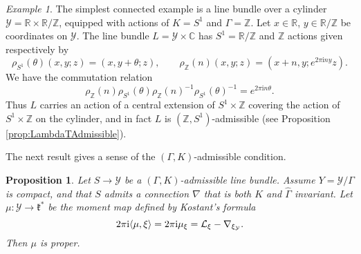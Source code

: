 \documentclass[11pt,reqno]{amsart}
\newtheorem{proposition}[theorem]{Proposition}
\theoremstyle{definition}
\theoremstyle{remark}
\newtheorem{example}[theorem]{Example}
\newcommand{\pair}[2]{\langle #1, #2 \rangle}
\renewcommand{\i}{{\mathrm{i}}}
\def\k{\ensuremath{\mathfrak{k}}}
\def\L{\ensuremath{\mathcal{L}}}
\def\Y{\ensuremath{\mathcal{Y}}}
\def\sY{\ensuremath{\mathsmaller{\mathcal{Y}}}}
\def\bC{\ensuremath{\mathbb{C}}}
\def\bR{\ensuremath{\mathbb{R}}}
\def\bZ{\ensuremath{\mathbb{Z}}}
\def\hGamma{\ensuremath{\widehat{\Gamma}}}
\begin{document}
\begin{example}
\label{ex:Cylinder}
The simplest connected example is a line bundle over a cylinder $\Y=\bR \times \bR/\bZ$, equipped with actions of $K=S^1$ and $\Gamma=\bZ$.  Let $x \in \bR$, $y \in \bR/\bZ$ be coordinates on $\Y$.  The line bundle $L=\Y \times \bC$ has $S^1=\bR/\bZ$ and $\bZ$ actions given respectively by 
\[ \rho_{\scriptscriptstyle S^1}(\theta)(x,y;z)=(x,y+\theta;z), \qquad \rho_{\scriptscriptstyle \bZ}(n)(x,y;z)=(x+n,y;e^{2\pi \i ny}z).\]
We have the commutation relation
\[ \rho_{\scriptscriptstyle \bZ}(n)\rho_{\scriptscriptstyle S^1}(\theta)\rho_{\scriptscriptstyle \bZ}(n)^{-1}\rho_{\scriptscriptstyle S^1}(\theta)^{-1}=e^{2\pi \i n\theta}.\] 
Thus $L$ carries an action of a central extension of $S^1 \times \bZ$ covering the action of $S^1 \times \bZ$ on the cylinder, and in fact $L$ is $(\bZ,S^1)$-admissible (see Proposition \ref{prop:LambdaTAdmissible}).
\end{example}
The next result gives a sense of the $(\Gamma,K)$-admissible condition.
\begin{proposition}
Let $S \rightarrow \Y$ be a $(\Gamma,K)$-admissible line bundle.  Assume $Y=\Y/\Gamma$ is compact, and that $S$ admits a connection $\nabla$ that is both $K$ and $\hGamma$ invariant.  Let $\mu \colon \Y \rightarrow \k^\ast$ be the moment map defined by Kostant's formula
\[ 2\pi \i \pair{\mu}{\xi}=2\pi \i \mu_\xi=\L_\xi-\nabla_{\xi_{\sY}}.\]
Then $\mu$ is proper.
\end{proposition}
\end{document}

